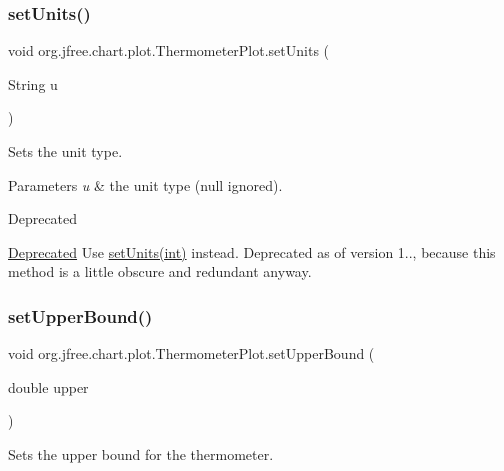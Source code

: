 \subsubsection{\texorpdfstring{set\+Units()}{setUnits()}\hspace{0.1cm}{\footnotesize\ttfamily [2/2]}}
{\footnotesize\ttfamily void org.\+jfree.\+chart.\+plot.\+Thermometer\+Plot.\+set\+Units (\begin{DoxyParamCaption}\item[{String}]{u }\end{DoxyParamCaption})}

Sets the unit type.


\begin{DoxyParams}{Parameters}
{\em u} & the unit type ({\ttfamily null} ignored).\\
\hline
\end{DoxyParams}
\begin{DoxyRefDesc}{Deprecated}
\item[\mbox{\hyperlink{deprecated__deprecated000091}{Deprecated}}]Use \mbox{\hyperlink{classorg_1_1jfree_1_1chart_1_1plot_1_1_thermometer_plot_a854875ffe9c0e66313089d022effdd44}{set\+Units(int)}} instead. Deprecated as of version 1.., because this method is a little obscure and redundant anyway. \end{DoxyRefDesc}
\mbox{\label{classorg_1_1jfree_1_1chart_1_1plot_1_1_thermometer_plot_a1a73cf46d74888646303ea48f4dce694}} 
\subsubsection{\texorpdfstring{set\+Upper\+Bound()}{setUpperBound()}}
{\footnotesize\ttfamily void org.\+jfree.\+chart.\+plot.\+Thermometer\+Plot.\+set\+Upper\+Bound (\begin{DoxyParamCaption}\item[{double}]{upper }\end{DoxyParamCaption})}

Sets the upper bound for the thermometer.


